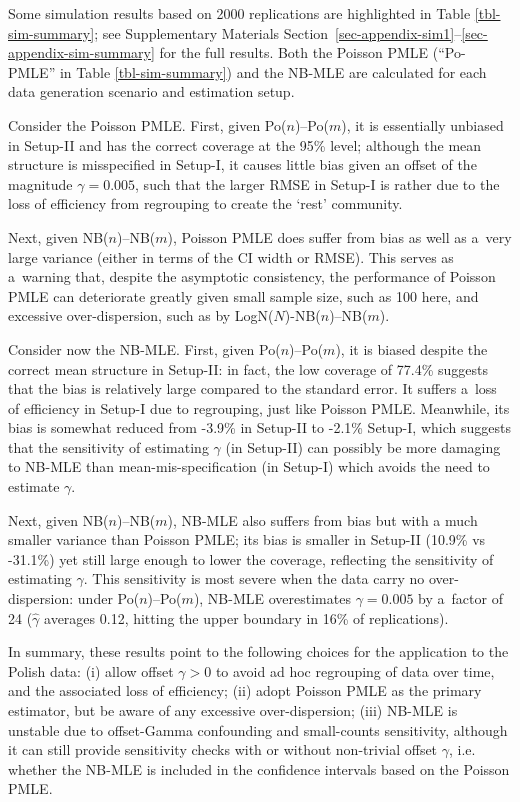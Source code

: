 Some simulation results based on 2000 replications are highlighted in Table \ref{tbl-sim-summary}; see Supplementary Materials Section~\ref{sec-appendix-sim1}--\ref{sec-appendix-sim-summary} for the full results. Both the Poisson PMLE (``Po-PMLE'' in Table \ref{tbl-sim-summary}) and the NB-MLE are calculated for each data generation scenario and estimation setup. 

Consider the Poisson PMLE. First, given Po($n$)--Po($m$), it is essentially unbiased in Setup-II and has the correct coverage at the 95\% level; although the mean structure is misspecified in Setup-I, it causes little bias given an offset of the magnitude $\gamma =0.005$, such that the larger RMSE in Setup-I is rather due to the loss of efficiency from regrouping to create the `rest' community. 

Next, given NB($n$)--NB($m$), Poisson PMLE does suffer from bias as well as a~very large variance (either in terms of the CI width or RMSE). This serves as a~warning that, despite the asymptotic consistency, the performance of Poisson PMLE can deteriorate greatly given small sample size, such as 100 here, and excessive over-dispersion, such as by LogN($N$)-NB($n$)--NB($m$). 

Consider now the NB-MLE. First, given Po($n$)--Po($m$), it is biased despite the correct mean structure in Setup-II: in fact, the low coverage of 77.4\% suggests that the bias is relatively large compared to the standard error. It suffers a~loss of efficiency in Setup-I due to regrouping, just like Poisson PMLE. Meanwhile, its bias is somewhat reduced from -3.9\% in Setup-II to -2.1\% Setup-I, which suggests that the sensitivity of estimating $\gamma$ (in Setup-II) can possibly be more damaging to NB-MLE than mean-mis-specification (in Setup-I) which avoids the need to estimate $\gamma$. 

Next, given NB($n$)–NB($m$), NB-MLE also suffers from bias but with a much smaller variance than Poisson PMLE; its bias is smaller in Setup-II (10.9\% vs -31.1\%) yet still large enough to lower the coverage, reflecting the sensitivity of estimating $\gamma$. This sensitivity is most severe when the data carry no over-dispersion: under Po($n$)–Po($m$), NB-MLE overestimates $\gamma = 0.005$ by a~factor of 24 ($\hat{\gamma}$ averages 0.12, hitting the upper boundary in 16\% of replications).

In summary, these results point to the following choices for the application to the Polish data: (i) allow offset $\gamma >0$ to avoid ad hoc regrouping of data over time, and the associated loss of efficiency; (ii) adopt Poisson PMLE as the primary estimator, but be aware of any excessive over-dispersion; (iii) NB-MLE is unstable due to offset-Gamma confounding and small-counts sensitivity, although it can still provide sensitivity checks with or without non-trivial offset $\gamma$, i.e. whether the NB-MLE is included in the confidence intervals based on the Poisson PMLE. 



